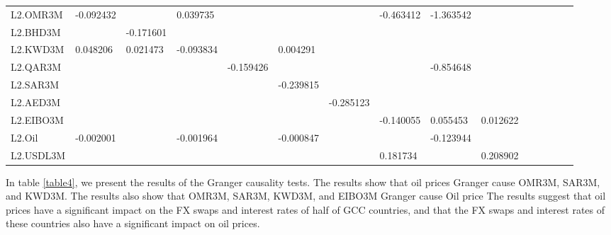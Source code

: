 \documentclass[12pt]{article}
\begin{document}
\begin{sloppypar}
\begin{table}[ht]
{\begin{tabular}{llllllllllllllr}
        L2.OMR3M & -0.092432 &  & 0.039735 &  &  &  & -0.463412 & -1.363542 &  \\
        L2.BHD3M &  & -0.171601 &  &  &  &  &  &  &  \\
        L2.KWD3M & 0.048206 & 0.021473 & -0.093834 &  & 0.004291 &  &  &  &  \\
        L2.QAR3M &  &  &  & -0.159426 &  &  &  & -0.854648 &  \\
        L2.SAR3M &  &  &  &  & -0.239815 &  &  &  &  \\
        L2.AED3M &  &  &  &  &  & -0.285123 &  &  &  \\
        L2.EIBO3M &  &  &  &  &  &  & -0.140055 & 0.055453 & 0.012622 \\
        L2.Oil & -0.002001 &  & -0.001964 &  & -0.000847 &  &  & -0.123944 &  \\
        L2.USDL3M &  &  &  &  &  &  & 0.181734 &  & 0.208902\\
        \hline
    \end{tabular}}%
\end{table}

In table \ref{table4}, we present the results of the Granger causality tests. The results show that oil prices Granger cause OMR3M, SAR3M, and KWD3M. The results also show that OMR3M, SAR3M, KWD3M, and EIBO3M Granger cause Oil price The results suggest that oil prices have a significant impact on the FX swaps and interest rates of half of GCC countries, and that the FX swaps and interest rates of these countries also have a significant impact on oil prices.

\begin{table}[ht]
    \centering
    \caption{Granger Causality Test Results}
    \label{table4}
\end{table}


\end{sloppypar}
\end{document}
